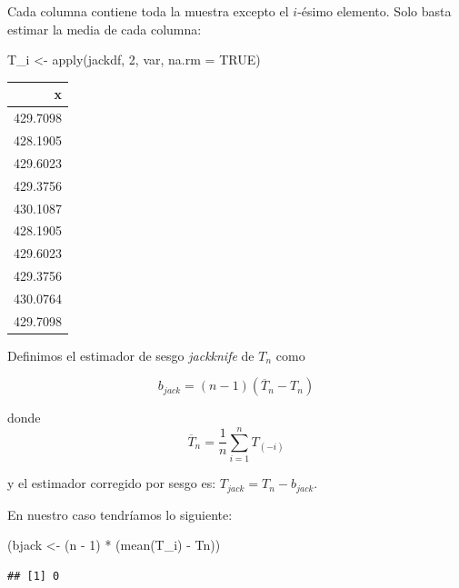 \documentclass[
  12pt,
]{book}
\newenvironment{Shaded}{\begin{snugshade}}{\end{snugshade}}
\newcommand{\AttributeTok}[1]{\textcolor[rgb]{0.77,0.63,0.00}{#1}}
\newcommand{\ConstantTok}[1]{\textcolor[rgb]{0.00,0.00,0.00}{#1}}
\newcommand{\DecValTok}[1]{\textcolor[rgb]{0.00,0.00,0.81}{#1}}
\newcommand{\FunctionTok}[1]{\textcolor[rgb]{0.00,0.00,0.00}{#1}}
\newcommand{\NormalTok}[1]{#1}
\newcommand{\OtherTok}[1]{\textcolor[rgb]{0.56,0.35,0.01}{#1}}
\newcommand{\SpecialCharTok}[1]{\textcolor[rgb]{0.00,0.00,0.00}{#1}}
\theoremstyle{definition}
\theoremstyle{definition}
\theoremstyle{definition}
\theoremstyle{definition}
\theoremstyle{remark}
\begin{document}
Cada columna contiene toda la muestra excepto el \(i\)-ésimo
elemento. Solo basta estimar la media de cada columna:

\begin{Shaded}
\begin{Highlighting}[]
\NormalTok{T\_i }\OtherTok{\textless{}{-}} \FunctionTok{apply}\NormalTok{(jackdf, }\DecValTok{2}\NormalTok{, var, }\AttributeTok{na.rm =} \ConstantTok{TRUE}\NormalTok{)}
\end{Highlighting}
\end{Shaded}

\begin{tabular}{r}
\hline
x\\
\hline
429.7098\\
\hline
428.1905\\
\hline
429.6023\\
\hline
429.3756\\
\hline
430.1087\\
\hline
428.1905\\
\hline
429.6023\\
\hline
429.3756\\
\hline
430.0764\\
\hline
429.7098\\
\hline
\end{tabular}

Definimos el estimador de sesgo \emph{jackknife} de \(T_n\) como

\begin{equation*}
b_{jack} = (n-1) (\overline{T}_{n} - T_{n})
\end{equation*}

donde
\begin{equation*}
\overline{T}_{n} = \frac{1}{n} \sum_{i=1}^{n} T_{(-i)}
\end{equation*}

y el estimador corregido por sesgo es: \(T_{jack}=T_n-b_{jack}\).

En nuestro caso tendríamos lo siguiente:

\begin{Shaded}
\begin{Highlighting}[]
\NormalTok{(bjack }\OtherTok{\textless{}{-}}\NormalTok{ (n }\SpecialCharTok{{-}} \DecValTok{1}\NormalTok{) }\SpecialCharTok{*}\NormalTok{ (}\FunctionTok{mean}\NormalTok{(T\_i) }\SpecialCharTok{{-}}\NormalTok{ Tn))}
\end{Highlighting}
\end{Shaded}

\begin{verbatim}
## [1] 0
\end{verbatim}
\end{document}
